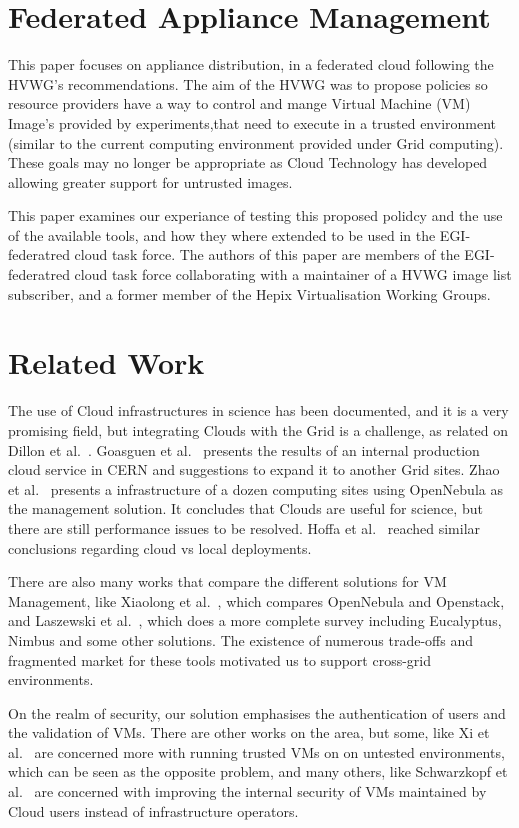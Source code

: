 \documentclass{llncs_Ibergrid2013}
\begin{document}
\section{Federated Appliance Management}
\label{sect-fedimagemanagement}

This paper focuses on appliance distribution, in a federated cloud following the HVWG's recommendations. The aim of the HVWG was to propose policies so resource providers have a way to control and mange Virtual Machine (VM) Image's provided by experiments,that need to execute in a trusted environment (similar to the current computing environment provided under Grid computing). These goals may no longer be appropriate as Cloud Technology has developed allowing greater support for untrusted images.

This paper examines our experiance of testing this proposed polidcy and the use of the available tools, and how they where extended to be used in the EGI-federatred cloud task force. The authors of this paper are members of the EGI-federatred cloud task force collaborating with a maintainer of a HVWG image list subscriber, and a former member of the Hepix Virtualisation Working Groups.
\section{Related Work}
\label{sect-relatedwork}
The use of Cloud infrastructures in science has been documented, and it is a very promising field, but integrating Clouds with the Grid is a challenge, as related on Dillon et al.~\cite{Dillon2010}. Goasguen et al.~\cite{Goasguen2012} presents the results of an internal production cloud service in CERN and suggestions to expand it to another Grid sites. Zhao et al.~\cite{Zhao2012} presents a infrastructure of a dozen computing sites using OpenNebula as the management solution. It concludes that Clouds are useful for science, but there are still performance issues to be resolved. Hoffa et al.~\cite{Hoffa2008} reached similar conclusions regarding cloud vs local deployments.

There are also many works that compare the different solutions for VM Management, like Xiaolong et al.~\cite{Xiaolong2012}, which compares OpenNebula and Openstack, and Laszewski et al.~\cite{Laszewski2012}, which does a more complete survey including Eucalyptus, Nimbus and some other solutions. The existence of numerous trade-offs and fragmented market for these tools motivated us to support cross-grid environments.

On the realm of security, our solution emphasises the authentication of users and the validation of VMs. There are other works on the area, but some, like Xi et al.~\cite{Xi2012} are concerned more with running trusted VMs on on untested environments, which can be seen as the opposite problem, and many others, like Schwarzkopf et al.~\cite{Schwarzkopf2012} are concerned with improving the internal security of VMs maintained by Cloud users instead of infrastructure operators.
\end{document}
